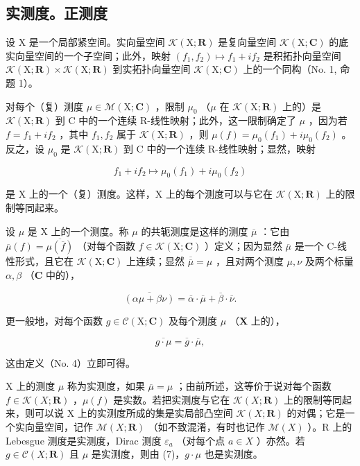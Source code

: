 \subsection{实测度。正测度}

设 X 是一个局部紧空间。实向量空间 \(\mathcal{K}(\mathrm{X};\mathbf{R})\) 是复向量空间 \(\mathcal{K}(\mathrm{X};\mathbf{C})\) 的底实向量空间的一个子空间；此外，映射 \((f_{1},f_{2})\mapsto f_{1}+if_{2}\) 是积拓扑向量空间 \(\mathcal{K}(\mathrm{X};\mathbf{R})\times\mathcal{K}(\mathrm{X};\mathbf{R})\) 到实拓扑向量空间 \(\mathcal{K}(\mathrm{X};\mathbf{C})\) 上的一个同构（No. 1, 命题 1）。

对每个（复）测度 \(\mu\in\mathcal{M}(\mathrm{X};\mathbf{C})\) ，限制 \(\mu_{0}\) （\(\mu\) 在 \(\mathcal{K}(\mathrm{X};\mathbf{R})\) 上的）是 \(\mathcal{K}(\mathrm{X};\mathbf{R})\) 到 C 中的一个连续 R-线性映射；此外，这一限制确定了 \(\mu\) ，因为若 \(f=f_{1}+if_{2}\) ，其中 \(f_{1},f_{2}\) 属于 \(\mathcal{K}(\mathrm{X};\mathbf{R})\) ，则 \(\mu(f)=\mu_{0}(f_{1})+i\mu_{0}(f_{2})\) 。反之，设 \(\mu_{0}\) 是 \(\mathcal{K}(\mathrm{X};\mathbf{R})\) 到 C 中的一个连续 R-线性映射；显然，映射

\[
f _ {1} + i f _ {2} \mapsto \mu_ {0} (f _ {1}) + i \mu_ {0} (f _ {2})
\]

是 X 上的一个（复）测度。这样，X 上的每个测度可以与它在 \(\mathcal{K}(\mathrm{X};\mathbf{R})\) 上的限制等同起来。

设 \(\mu\) 是 X 上的一个测度。称 \(\mu\) 的共轭测度是这样的测度 \(\overline{\mu}\) ：它由 \(\overline{\mu}(f) = \overline{\mu(\overline{f})}\) （对每个函数 \(f \in \mathcal{K}(\mathrm{X};\mathbf{C})\) ）定义；因为显然 \(\overline{\mu}\) 是一个 C-线性形式，且它在 \(\mathcal{K}(\mathrm{X};\mathbf{C})\) 上连续；显然 \(\overline{\overline{\mu}} = \mu\) ，且对两个测度 \(\mu, \nu\) 及两个标量 \(\alpha, \beta\) （\(\mathbf{C}\) 中的），

\[
\overline {{(\alpha \mu + \beta \nu)}} = \overline {{\alpha}} \cdot \overline {{\mu}} + \overline {{\beta}} \cdot \overline {{\nu}}.
\]

更一般地，对每个函数 \(g \in \mathcal{C}(\mathrm{X};\mathbf{C})\) 及每个测度 \(\mu\) （\(\mathbf{X}\) 上的），

\[
\overline {{{g \cdot \mu}}} = \overline {{{g}}} \cdot \overline {{{\mu}}},\tag{7}
\]

这由定义（No. 4）立即可得。

X 上的测度 \(\mu\) 称为实测度，如果 \(\overline{\mu} = \mu\) ；由前所述，这等价于说对每个函数 \(f \in \mathcal{K}(X; \mathbf{R})\) ，\(\mu(f)\) 是实数。若把实测度与它在 \(\mathcal{K}(X; \mathbf{R})\) 上的限制等同起来，则可以说 X 上的实测度所成的集是实局部凸空间 \(\mathcal{K}(X; \mathbf{R})\) 的对偶；它是一个实向量空间，记作 \(\mathcal{M}(X; \mathbf{R})\) （如不致混淆，有时也记作 \(\mathcal{M}(X)\) ）。R 上的 Lebesgue 测度是实测度，Dirac 测度 \(\varepsilon_{a}\) （对每个点 \(a \in X\) ）亦然。若 \(g \in \mathcal{C}(X; \mathbf{R})\) 且 \(\mu\) 是实测度，则由 (7)，\(g \cdot \mu\) 也是实测度。

